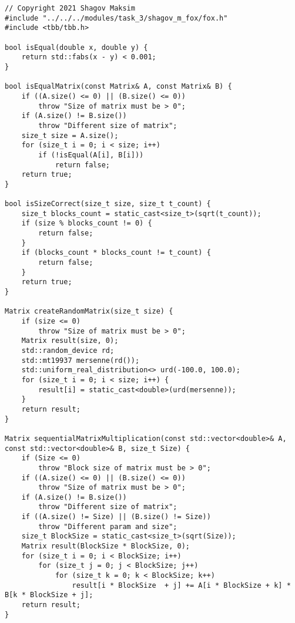 \documentclass{report}
\begin{document}
\begin{lstlisting}
// Copyright 2021 Shagov Maksim
#include "../../../modules/task_3/shagov_m_fox/fox.h"
#include <tbb/tbb.h>

bool isEqual(double x, double y) {
    return std::fabs(x - y) < 0.001;
}

bool isEqualMatrix(const Matrix& A, const Matrix& B) {
    if ((A.size() <= 0) || (B.size() <= 0))
        throw "Size of matrix must be > 0";
    if (A.size() != B.size())
        throw "Different size of matrix";
    size_t size = A.size();
    for (size_t i = 0; i < size; i++)
        if (!isEqual(A[i], B[i]))
            return false;
    return true;
}

bool isSizeCorrect(size_t size, size_t t_count) {
    size_t blocks_count = static_cast<size_t>(sqrt(t_count));
    if (size % blocks_count != 0) {
        return false;
    }
    if (blocks_count * blocks_count != t_count) {
        return false;
    }
    return true;
}

Matrix createRandomMatrix(size_t size) {
    if (size <= 0)
        throw "Size of matrix must be > 0";
    Matrix result(size, 0);
    std::random_device rd;
    std::mt19937 mersenne(rd());
    std::uniform_real_distribution<> urd(-100.0, 100.0);
    for (size_t i = 0; i < size; i++) {
        result[i] = static_cast<double>(urd(mersenne));
    }
    return result;
}

Matrix sequentialMatrixMultiplication(const std::vector<double>& A, const std::vector<double>& B, size_t Size) {
    if (Size <= 0)
        throw "Block size of matrix must be > 0";
    if ((A.size() <= 0) || (B.size() <= 0))
        throw "Size of matrix must be > 0";
    if (A.size() != B.size())
        throw "Different size of matrix";
    if ((A.size() != Size) || (B.size() != Size))
        throw "Different param and size";
    size_t BlockSize = static_cast<size_t>(sqrt(Size));
    Matrix result(BlockSize * BlockSize, 0);
    for (size_t i = 0; i < BlockSize; i++)
        for (size_t j = 0; j < BlockSize; j++)
            for (size_t k = 0; k < BlockSize; k++)
                result[i * BlockSize  + j] += A[i * BlockSize + k] * B[k * BlockSize + j];
    return result;
}


\end{lstlisting}
\end{document}
